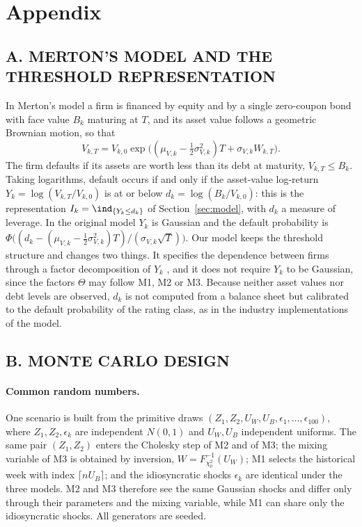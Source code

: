 \appendix
\section*{Appendix}

\subsection*{A. MERTON'S MODEL AND THE THRESHOLD REPRESENTATION}
In Merton's model \citep[Ch.~2]{DeGiorgi26} a firm is financed by equity and by a single zero-coupon bond with face value $B_k$ maturing at $T$, and its asset value follows a geometric Brownian motion, so that
\[
V_{k,T}=V_{k,0}\exp\!\big((\mu_{V,k}-\tfrac12\sigma_{V,k}^2)T+\sigma_{V,k}W_{k,T}\big).
\]
The firm defaults if its assets are worth less than its debt at maturity, $V_{k,T}\le B_k$. Taking logarithms, default occurs if and only if the asset-value log-return $Y_k=\log(V_{k,T}/V_{k,0})$ is at or below $d_k=\log(B_k/V_{k,0})$: this is the representation $I_k=\ind_{\{Y_k\le d_k\}}$ of Section~\ref{sec:model}, with $d_k$ a measure of leverage. In the original model $Y_k$ is Gaussian and the default probability is $\Phi\big((d_k-(\mu_{V,k}-\frac12\sigma_{V,k}^2)T)/(\sigma_{V,k}\sqrt T)\big)$. Our model keeps the threshold structure and changes two things. It specifies the dependence between firms through a factor decomposition of $Y_k$ \citep[Sect.~8.3]{McNeil05}, and it does not require $Y_k$ to be Gaussian, since the factors $\Theta$ may follow M1, M2 or M3. Because neither asset values nor debt levels are observed, $d_k$ is not computed from a balance sheet but calibrated to the default probability of the rating class, as in the industry implementations of the model.

\subsection*{B. MONTE CARLO DESIGN}
\paragraph{Common random numbers.}
One scenario is built from the primitive draws $(Z_1,Z_2,U_W,U_B,\epsilon_1,\dots,\epsilon_{100})$, where $Z_1,Z_2,\epsilon_k$ are independent $N(0,1)$ and $U_W,U_B$ independent uniforms. The same pair $(Z_1,Z_2)$ enters the Cholesky step of M2 and of M3; the mixing variable of M3 is obtained by inversion, $W=F^{-1}_{\chi^2_{\hat\nu}}(U_W)$; M1 selects the historical week with index $\lceil nU_B\rceil$; and the idiosyncratic shocks $\epsilon_k$ are identical under the three models. M2 and M3 therefore see the same Gaussian shocks and differ only through their parameters and the mixing variable, while M1 can share only the idiosyncratic shocks. All generators are seeded.

